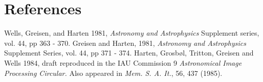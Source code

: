 \section{References }
\hspace*{  0.00cm } Wells, Greisen, and Harten 1981, {\it Astronomy
and Astrophysics} Supplement series, vol. 44, pp 363 - 370.
\smallskip
\hspace*{  0.00cm } Greisen and Harten, 1981, {\it Astronomy and
Astrophysics}  Supplement Series, vol. 44, pp 371 - 374.
\smallskip
\hspace*{  0.00cm } Harten, Grosb\o l, Tritton, Greisen and Wells 1984,
draft reproduced in the IAU Commission 9 {\it Astronomical Image
Processing Circular.} Also appeared in {\it Mem. S. A. It.}, 56, 437
(1985).
